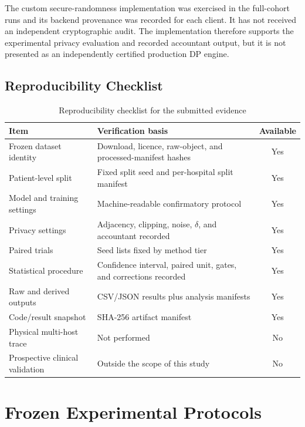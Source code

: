 The custom secure-randomness implementation was exercised in the full-cohort runs and its backend provenance was recorded for each client. It has not received an independent cryptographic audit. The implementation therefore supports the experimental privacy evaluation and recorded accountant output, but it is not presented as an independently certified production DP engine.

\section{Reproducibility Checklist}
\label{appsec:reproducibility-checklist}

\begin{table}[htbp]
    \centering
    \caption{Reproducibility checklist for the submitted evidence}
    \label{tab:reproducibility-checklist}
    \begin{tabularx}{\textwidth}{@{}lXc@{}}
        \toprule
        Item & Verification basis & Available \\
        \midrule
        Frozen dataset identity & Download, licence, raw-object, and processed-manifest hashes & Yes \\
        Patient-level split & Fixed split seed and per-hospital split manifest & Yes \\
        Model and training settings & Machine-readable confirmatory protocol & Yes \\
        Privacy settings & Adjacency, clipping, noise, $\delta$, and accountant recorded & Yes \\
        Paired trials & Seed lists fixed by method tier & Yes \\
        Statistical procedure & Confidence interval, paired unit, gates, and corrections recorded & Yes \\
        Raw and derived outputs & CSV/JSON results plus analysis manifests & Yes \\
        Code/result snapshot & SHA-256 artifact manifest & Yes \\
        Physical multi-host trace & Not performed & No \\
        Prospective clinical validation & Outside the scope of this study & No \\
        \bottomrule
    \end{tabularx}
\end{table}


\chapter{Frozen Experimental Protocols}
\label{app:experimental-protocols}

